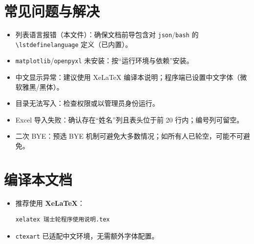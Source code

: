 \documentclass[12pt]{ctexart}
\begin{document}
\section{常见问题与解决}
\begin{itemize}[leftmargin=1.6em]
  \item 列表语言报错（本文件）：确保文档前导包含对 \texttt{json}/\texttt{bash} 的 \lstinline|\lstdefinelanguage| 定义（已内置）。
  \item \texttt{matplotlib}/\texttt{openpyxl} 未安装：按“运行环境与依赖”安装。
  \item 中文显示异常：建议使用 XeLaTeX 编译本说明；程序端已设置中文字体（微软雅黑/黑体）。
  \item 目录无法写入：检查权限或以管理员身份运行。
  \item Excel 导入失败：确认存在“姓名”列且表头位于前 20 行内；编号列可留空。
  \item 二次 BYE：预选 BYE 机制可避免大多数情况；如所有人已轮空，可能不可避免。
\end{itemize}

\section{编译本文档}
\begin{itemize}[leftmargin=1.6em]
  \item 推荐使用 \textbf{XeLaTeX}：
\begin{lstlisting}[language=bash]
xelatex 瑞士轮程序使用说明.tex
\end{lstlisting}
  \item \texttt{ctexart} 已适配中文环境，无需额外字体配置。
\end{itemize}
\end{document}
